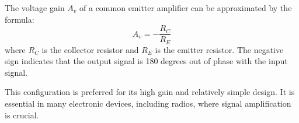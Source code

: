 The voltage gain \( A_v \) of a common emitter amplifier can be approximated by the formula:
\[
A_v = -\frac{R_C}{R_E}
\]
where \( R_C \) is the collector resistor and \( R_E \) is the emitter resistor. The negative sign indicates that the output signal is 180 degrees out of phase with the input signal.

This configuration is preferred for its high gain and relatively simple design. It is essential in many electronic devices, including radios, where signal amplification is crucial.


